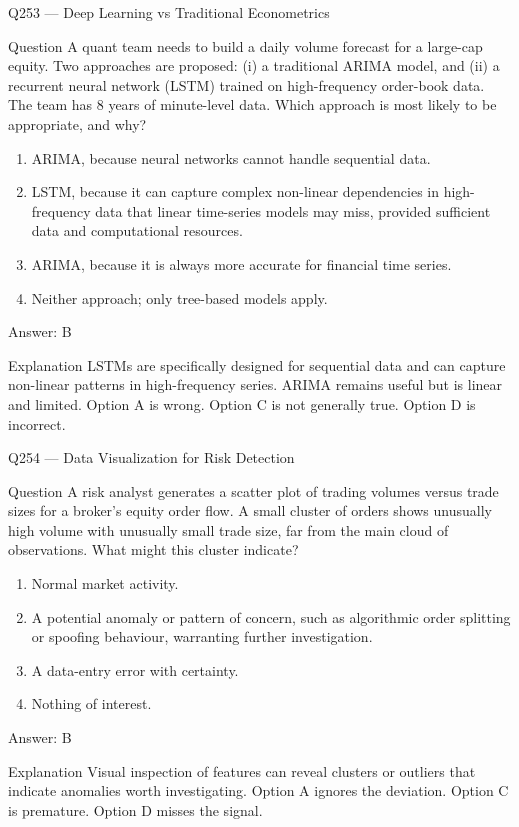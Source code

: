 \documentclass[aspectratio=169,8pt]{beamer}
\begin{document}
\begin{frame}{Q253 --- Deep Learning vs Traditional Econometrics}
\begin{block}{Question}
A quant team needs to build a daily volume forecast for a large-cap equity. Two approaches are proposed: (i) a traditional ARIMA model, and (ii) a recurrent neural network (LSTM) trained on high-frequency order-book data. The team has 8 years of minute-level data. Which approach is most likely to be appropriate, and why?
\end{block}
\begin{enumerate}
\item ARIMA, because neural networks cannot handle sequential data.
\item LSTM, because it can capture complex non-linear dependencies in high-frequency data that linear time-series models may miss, provided sufficient data and computational resources.
\item ARIMA, because it is always more accurate for financial time series.
\item Neither approach; only tree-based models apply.
\end{enumerate}
\begin{exampleblock}{Answer: B}\end{exampleblock}
\begin{block}{Explanation}
LSTMs are specifically designed for sequential data and can capture non-linear patterns in high-frequency series. ARIMA remains useful but is linear and limited. Option A is wrong. Option C is not generally true. Option D is incorrect.
\end{block}
\end{frame}

\begin{frame}{Q254 --- Data Visualization for Risk Detection}
\begin{block}{Question}
A risk analyst generates a scatter plot of trading volumes versus trade sizes for a broker's equity order flow. A small cluster of orders shows unusually high volume with unusually small trade size, far from the main cloud of observations. What might this cluster indicate?
\end{block}
\begin{enumerate}
\item Normal market activity.
\item A potential anomaly or pattern of concern, such as algorithmic order splitting or spoofing behaviour, warranting further investigation.
\item A data-entry error with certainty.
\item Nothing of interest.
\end{enumerate}
\begin{exampleblock}{Answer: B}\end{exampleblock}
\begin{block}{Explanation}
Visual inspection of features can reveal clusters or outliers that indicate anomalies worth investigating. Option A ignores the deviation. Option C is premature. Option D misses the signal.
\end{block}
\end{frame}
\end{document}

